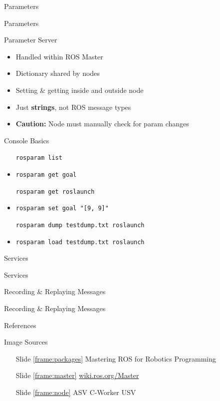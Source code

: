 \documentclass[9pt]{beamer}
\begin{document}
\begin{section}{Parameters}
    \begin{frame}{Parameters}
        \begin{block}{Parameter Server}
            \begin{itemize}
                \item Handled within ROS Master
                \item Dictionary shared by nodes
                \item Setting \& getting inside and outside node
                \item Just \textbf{strings}, not ROS message types
                \item \textbf{Caution:} Node must manually check for param changes
            \end{itemize}
        \end{block}
        \begin{block}{Console Basics}
            \begin{itemize}
                \item[] \lstinline{rosparam list}
                \item[] \lstinline{rosparam get goal}
                \item[] \lstinline{rosparam get roslaunch}
                \item[] \lstinline{rosparam set goal "[9, 9]"}
                \item[] \lstinline{rosparam dump testdump.txt roslaunch}
                \item[] \lstinline{rosparam load testdump.txt roslaunch}
            \end{itemize}
        \end{block}        
    \end{frame}
\end{section}

\begin{section}{Services}
    \begin{frame}{Services}

    \end{frame}
\end{section}

\begin{section}{Recording \& Replaying Messages}
    \begin{frame}{Recording \& Replaying Messages}
    \end{frame}
\end{section}

\begin{section}{References}
    \begin{frame}{Image Sources}
        \begin{itemize}
            \item [Slide \ref{frame:packages}] Mastering ROS for Robotics Programming
            \item [Slide \ref{frame:master}] \url{wiki.ros.org/Master}
            \item [Slide \ref{frame:node}] ASV C-Worker USV 
        \end{itemize}
    \end{frame}
\end{section}
\end{document}
